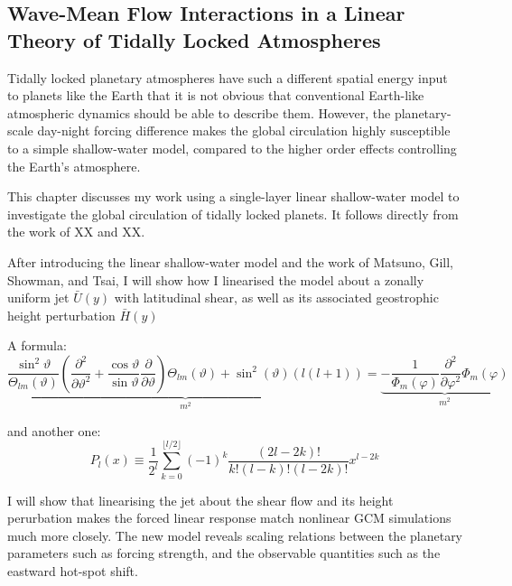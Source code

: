 \begin{SingleSpace}
\chapter{Wave-Mean Flow Interactions in a Linear Theory of Tidally Locked Atmospheres}\label{ch:wave-mean-flow}
\vspace{0.5cm}
\end{SingleSpace}
\vspace{0.5cm}


Tidally locked planetary atmospheres have such a different spatial energy input to planets like the Earth that it is not obvious that conventional Earth-like atmospheric dynamics should be able to describe them. However, the planetary-scale day-night forcing difference makes the global circulation highly susceptible to a simple shallow-water model, compared to the higher order effects controlling the Earth's atmosphere.

This chapter discusses my work using a single-layer linear shallow-water model to investigate the global circulation of tidally locked planets. It follows directly from the work of XX and XX.

After introducing the linear shallow-water model and the work of Matsuno, Gill, Showman, and Tsai, I will show how I linearised the model about a zonally uniform jet $\bar{U}(y)$ with latitudinal shear, as well as its associated geostrophic height perturbation $\bar{H}(y)$

A formula:
\[
  \underbrace{\frac{\sin^{2}\vartheta}{\Theta_{lm}(\vartheta)}\left(\frac{\partial^{2}}{\partial\vartheta^{2}}+\frac{\cos\vartheta}{\sin\vartheta}\frac{\partial}{\partial\vartheta}\right)\Theta_{lm}(\vartheta)+\sin^{2}(\vartheta)(l(l+1))}_{m^{2}}=\underbrace{-\frac{1}{\Phi_{m}(\varphi)}\frac{\partial^{2}}{\partial\varphi^{2}}\Phi_{m}(\varphi)}_{m^{2}}
\]

and another one:
\[
  P_l (x)\equiv\frac {1}{2^l}\sum_{k=0}^{\lfloor l/2\rfloor} (-1)^k \frac{(2l-2k)!}{k!(l-k)!(l-2k)!} x^{l-2k}
\]

I will show that linearising the jet about the shear flow and its height perurbation makes the forced linear response match nonlinear GCM simulations much more closely. The new model reveals scaling relations between the planetary parameters such as forcing strength, and the observable quantities such as the eastward hot-spot shift.


